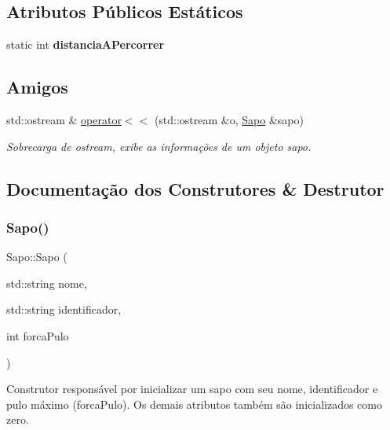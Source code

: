 \subsection*{Atributos Públicos Estáticos}
\begin{DoxyCompactItemize}
\item 
\mbox{\label{classSapo_a5ac5381b9ab3b53a378dacdbed9f3646}} 
static int {\bfseries distancia\+A\+Percorrer}
\end{DoxyCompactItemize}
\subsection*{Amigos}
\begin{DoxyCompactItemize}
\item 
std\+::ostream \& \hyperlink{classSapo_a295992e9cef7ed41031bd2a0a9e70646}{operator$<$$<$} (std\+::ostream \&o, \hyperlink{classSapo}{Sapo} \&sapo)
\begin{DoxyCompactList}\small\item\em Sobrecarga de ostream, exibe as informações de um objeto sapo. \end{DoxyCompactList}\end{DoxyCompactItemize}


\subsection{Documentação dos Construtores \& Destrutor}
\mbox{\label{classSapo_a402f1c5435dd13180835b3b847e4bd7c}} 
\subsubsection{\texorpdfstring{Sapo()}{Sapo()}}
{\footnotesize\ttfamily Sapo\+::\+Sapo (\begin{DoxyParamCaption}\item[{std\+::string}]{nome,  }\item[{std\+::string}]{identificador,  }\item[{int}]{forca\+Pulo }\end{DoxyParamCaption})}



Construtor responsável por inicializar um sapo com seu nome, identificador e pulo máximo (forca\+Pulo). Os demais atributos também são inicializados como zero. 


